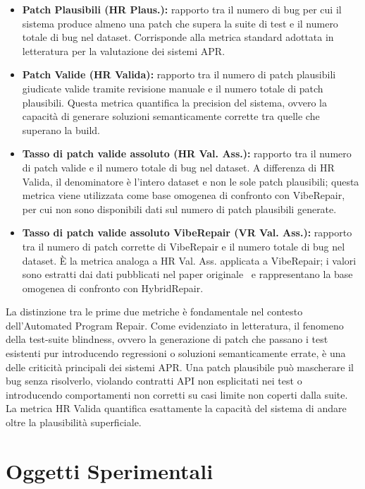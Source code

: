 \begin{itemize}
    \item \textbf{Patch Plausibili (HR Plaus.):} rapporto tra il numero di bug per cui il sistema produce almeno una patch
    che supera la suite di test e il numero totale di bug nel dataset. Corrisponde alla metrica standard adottata in
    letteratura per la valutazione dei sistemi APR.
    \item \textbf{Patch Valide (HR Valida):} rapporto tra il numero di patch plausibili giudicate valide tramite revisione
    manuale e il numero totale di patch plausibili. Questa metrica quantifica la precision del sistema, ovvero la capacità
    di generare soluzioni semanticamente corrette tra quelle che superano la build.
    \item \textbf{Tasso di patch valide assoluto (HR Val. Ass.):} rapporto tra il numero di patch valide e il numero totale di bug nel
    dataset. A differenza di HR Valida, il denominatore è l'intero dataset e non le sole patch plausibili; questa metrica
    viene utilizzata come base omogenea di confronto con VibeRepair, per cui non sono disponibili dati sul numero di
    patch plausibili generate.
    \item \textbf{Tasso di patch valide assoluto VibeRepair (VR Val. Ass.):} rapporto tra il numero di patch corrette di VibeRepair
    e il numero totale di bug nel dataset. È la metrica analoga a HR Val. Ass. applicata a VibeRepair; i valori sono estratti
    dai dati pubblicati nel paper originale~\cite{zhu2026specification} e rappresentano la base omogenea di confronto con HybridRepair.
\end{itemize}

La distinzione tra le prime due metriche è fondamentale nel contesto dell'Automated Program Repair.
Come evidenziato in letteratura, il fenomeno della test-suite blindness, ovvero la generazione di patch che passano i test
esistenti pur introducendo regressioni o soluzioni semanticamente errate, è una delle criticità principali dei sistemi APR.
Una patch plausibile può mascherare il bug senza risolverlo, violando contratti API non esplicitati nei test o introducendo comportamenti
non corretti su casi limite non coperti dalla suite. La metrica HR Valida quantifica esattamente la capacità del sistema di andare oltre
la plausibilità superficiale.



\section{Oggetti Sperimentali}

